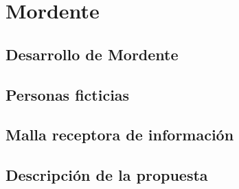 \chapter{Mordente}

\section{Desarrollo de Mordente}


\section{Personas ficticias}


\section{Malla receptora de información}


\section{Descripción de la propuesta}



